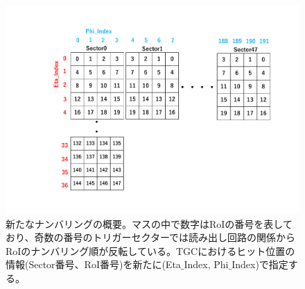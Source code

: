 \begin{figure}[tb]
  \centering
  \hspace*{-1cm}
  \includegraphics[clip, width=14cm]{fig/4/new_numbering.pdf}
  \caption{新たなナンバリングの概要。マスの中で数字はRoIの番号を表しており、奇数の番号のトリガーセクターでは読み出し回路の関係からRoIのナンバリング順が反転している。TGCにおけるヒット位置の情報(Sector番号、RoI番号)を新たに(Eta$\_$Index, Phi$\_$Index)で指定する。}
  \label{fig:newnumbering}
\end{figure}

